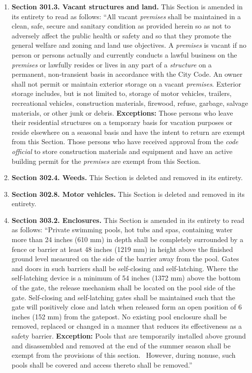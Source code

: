 \begin{enumerate}[{\indent}1)]
    \item \textbf{Section 301.3. Vacant structures and land.} This Section is amended in its entirety to read as follows: “All vacant \textit{premises} shall be maintained in a clean, safe, secure and sanitary condition as provided herein so as not to adversely affect the public health or safety and so that they promote the general welfare and zoning and land use objectives.  A \textit{premises} is vacant if no person or persons actually and currently conducts a lawful business on the \textit{premises} or lawfully resides or lives in any part of a \textit{structure} on a permanent, non-transient basis in accordance with the City Code.  An owner shall not permit or maintain exterior storage on a vacant \textit{premises}. Exterior storage includes, but is not limited to, storage of motor vehicles, trailers, recreational vehicles, construction materials, firewood, refuse, garbage, salvage materials, or other junk or debris.  \textbf{Exceptions:} Those persons who leave their residential structures on a temporary basis for vacation purposes or reside elsewhere on  a seasonal basis and have the intent to return are exempt from this Section. Those persons who have received approval from the \textit{code official} to store construction materials and equipment and have an active building permit for the \textit{premises} are exempt from this Section.
    \item \textbf{Section 302.4. Weeds.} This Section is deleted and removed in its entirety.
    \item \textbf{Section 302.8. Motor vehicles.} This Section is deleted and removed in its entirety.
    \item \textbf{Section 303.2. Enclosures.} This Section is amended in its entirety to read as follows: “Private swimming pools, hot tubs and spas, containing water more than 24 inches (610 mm) in depth shall be completely surrounded by a fence or barrier at least 48 inches (1219 mm) in height above the finished ground level measured on the side of the barrier away from the pool.  Gates and doors in such barriers shall be self-closing and self-latching.  Where the self-latching device is a minimum of 54 inches (1372 mm) above the bottom of the gate, the release mechanism shall be located on the pool side of the gate. Self-closing and self-latching gates shall be maintained such that the gate will positively close and latch when released form an open position of 6 inches (152 mm) from the gatepost.  No existing pool enclosure shall be removed, replaced or changed in a manner that reduces its effectiveness as a safety barrier.  \textbf{Exception:} Pools that are temporarily installed above ground and disassembled and removed at the end of the summer season shall be exempt from the provisions of this section.  However, during nonuse, such pools shall be covered and access thereto shall be removed.”

\end{enumerate}
